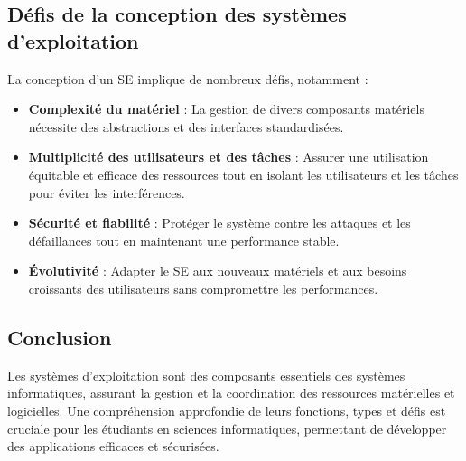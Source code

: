\subsection{Défis de la conception des systèmes d'exploitation}
La conception d'un SE implique de nombreux défis, notamment :
\begin{itemize}
    \item \textbf{Complexité du matériel} : La gestion de divers composants matériels nécessite des abstractions et des interfaces standardisées.
    \item \textbf{Multiplicité des utilisateurs et des tâches} : Assurer une utilisation équitable et efficace des ressources tout en isolant les utilisateurs et les tâches pour éviter les interférences.
    \item \textbf{Sécurité et fiabilité} : Protéger le système contre les attaques et les défaillances tout en maintenant une performance stable.
    \item \textbf{Évolutivité} : Adapter le SE aux nouveaux matériels et aux besoins croissants des utilisateurs sans compromettre les performances.
\end{itemize}

\subsection{Conclusion}
Les systèmes d'exploitation sont des composants essentiels des systèmes informatiques, assurant la gestion et la coordination des ressources matérielles et logicielles. 
Une compréhension approfondie de leurs fonctions, types et défis est cruciale pour les étudiants en sciences informatiques, permettant de développer des applications efficaces et sécurisées.
